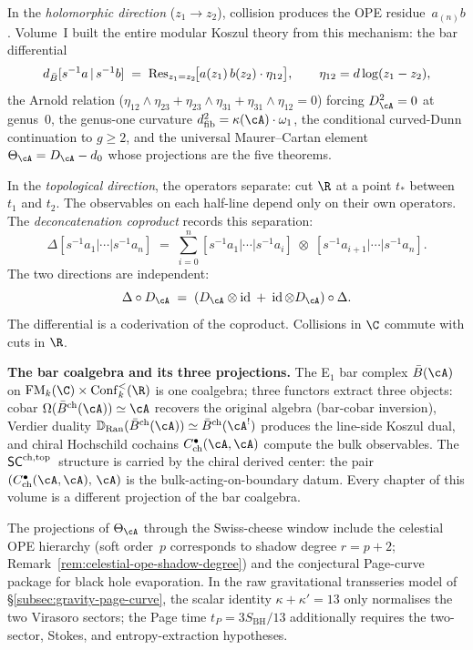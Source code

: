 In the \emph{holomorphic direction} ($z_1 \to z_2$), collision produces the OPE residue~$a_{(n)}b$. Volume~I built the entire modular Koszul theory from this mechanism: the bar differential
\[
d_{\bar{B}}[s^{-1}a \,|\, s^{-1}b]
\;=\;
\operatorname{Res}_{z_1 = z_2}\!\bigl[
 a(z_1)\,b(z_2)\cdot\eta_{12}
\bigr],
\qquad
\eta_{12} = d\log(z_1 - z_2),
\]
the Arnold relation ($\eta_{12} \wedge \eta_{23} + \eta_{23} \wedge \eta_{31} + \eta_{31} \wedge \eta_{12} = 0$) forcing $D_\cA^2 = 0$ at genus~$0$, the genus-one curvature $d_{\mathrm{fib}}^2 = \kappa(\cA) \cdot \omega_1$, the conditional curved-Dunn continuation to $g \ge 2$, and the universal Maurer--Cartan element $\Theta_\cA = D_\cA - d_0$ whose projections are the five theorems.

In the \emph{topological direction}, the operators separate: cut $\R$ at a point $t_*$ between $t_1$ and $t_2$. The observables on each half-line depend only on their own operators. The \emph{deconcatenation coproduct} records this separation:
\begin{equation}\label{eq:preface2-delta}
\Delta[s^{-1}a_1|\cdots|s^{-1}a_n]
\;=\;
\sum_{i=0}^{n}
[s^{-1}a_1|\cdots|s^{-1}a_i]
\;\otimes\;
[s^{-1}a_{i+1}|\cdots|s^{-1}a_n].
\end{equation}
The two directions are independent:
\begin{equation}\label{eq:preface2-coderivation}
\Delta \circ D_\cA
\;=\;
(D_\cA \otimes \id \;+\; \id \otimes D_\cA) \circ \Delta.
\end{equation}
The differential is a coderivation of the coproduct. Collisions in $\C$ commute with cuts in $\R$.

\medskip
\noindent\textbf{The bar coalgebra and its three projections.}\enspace
The E$_1$ bar complex $\barB(\cA)$ on $\FM_k(\C) \times \Conf_k^{<}(\R)$ is one coalgebra; three functors extract three objects: cobar $\Omega(\barBch(\cA)) \simeq \cA$ recovers the original algebra (bar-cobar inversion), Verdier duality $\mathbb{D}_{\mathrm{Ran}}(\barBch(\cA)) \simeq \barBch(\cA^!)$ produces the line-side Koszul dual, and chiral Hochschild cochains $C^\bullet_{\mathrm{ch}}(\cA,\cA)$ compute the bulk observables. The $\mathsf{SC}^{\mathrm{ch,top}}$~structure is carried by the chiral derived center: the pair $(C^\bullet_{\mathrm{ch}}(\cA,\cA),\,\cA)$ is the bulk-acting-on-boundary datum. Every chapter of this volume is a different projection of the bar coalgebra.

The projections of $\Theta_\cA$ through the Swiss-cheese window include the celestial OPE hierarchy (soft order~$p$ corresponds to shadow degree $r = p+2$; Remark~\ref{rem:celestial-ope-shadow-degree}) and the conjectural Page-curve package for black hole evaporation. In the raw gravitational transseries model of \S\ref{subsec:gravity-page-curve}, the scalar identity $\kappa + \kappa' = 13$ only normalises the two Virasoro sectors; the Page time $t_P = 3S_{\mathrm{BH}}/13$ additionally requires the two-sector, Stokes, and entropy-extraction hypotheses.

